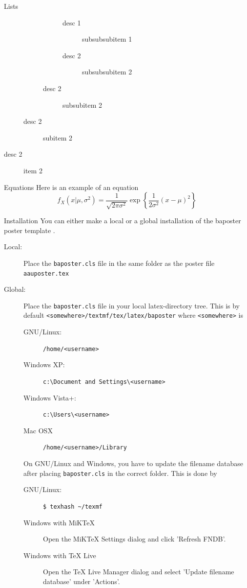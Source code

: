 \documentclass[a0paper,portrait]{baposter}
\begin{document}
\begin{poster}
\begin{posterbox}[name=lists,column=0,below=usage]{Lists}
\begin{description}
\begin{description}
\begin{description}
\begin{description}
              \item[desc 1] subsubsubitem 1
              \item[desc 2] subsubsubitem 2
            \end{description}
          \item[desc 2] subsubitem 2
        \end{description}
      \item[desc 2] subitem 2
    \end{description}
  \item[desc 2] item 2
\end{description}
\end{posterbox}

\begin{posterbox}[name=equation,column=0,below=lists,above=bottom]{Equations}
Here is an example of an equation
\begin{equation}
  f_X(x|\mu,\sigma^2) = \frac{1}{\sqrt{2\pi\sigma^2}}\exp\left\{\frac{1}{2\sigma^2}(x-\mu)^2\right\}
\end{equation}
\end{posterbox}

\begin{posterbox}[name=install,span=2,column=1,row=0]{Installation}
You can either make a local or a global installation of the baposter poster template \cite{baposter}.
\begin{description}
  \item[Local:] Place the {\tt baposter.cls} file in the same folder as the poster file {\tt aauposter.tex}
  \item[Global:] Place the {\tt baposter.cls} file in your local latex-directory tree. This is by default {\tt <somewhere>/textmf/tex/latex/baposter} where {\tt <somewhere>} is
  \begin{description}
    \item[GNU/Linux:] {\tt/home/<username>}
    \item[Windows XP:] {\tt c:\textbackslash Document and Settings\textbackslash<username>}
    \item[Windows Vista+:] {\tt c:\textbackslash Users\textbackslash<username>}
    \item[Mac OSX] {\tt/home/<username>/Library}
  \end{description}
  On GNU/Linux and Windows, you have to update the filename database after placing {\tt baposter.cls} in the correct folder. This is done by
  \begin{description}
    \item[GNU/Linux:] {\tt \$ texhash \textasciitilde /texmf}
    \item[Windows with MiKTeX] Open the MiKTeX Settings dialog and click 'Refresh FNDB'.
    \item[Windows with TeX Live] Open the TeX Live Manager dialog and select 'Update filename database' under 'Actions'.
  \end{description}
\end{description}
\end{posterbox}


\end{poster}
\end{document}
